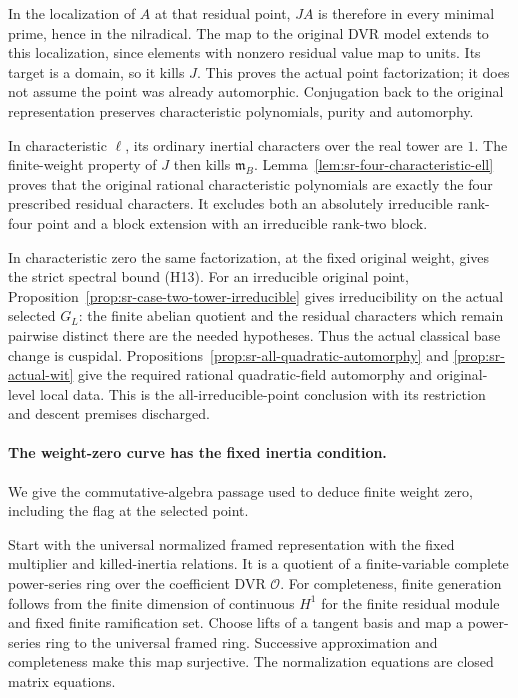 In the localization of \(A\) at that residual point,
\(JA\) is therefore in every minimal prime, hence in the
nilradical. The map to the original DVR model extends to
this localization, since elements with nonzero residual
value map to units. Its target is a domain, so it kills
\(J\). This proves the actual point factorization; it
does not assume the point was already automorphic.
Conjugation back to the original representation preserves
characteristic polynomials, purity and automorphy.

In characteristic \(\ell\), its ordinary inertial
characters over the real tower are \(1\).
The finite-weight property of \(J\) then kills
\(\mathfrak m_B\).
Lemma~\ref{lem:sr-four-characteristic-ell} proves that the
original rational characteristic polynomials are exactly
the four prescribed residual characters.
It excludes both an absolutely irreducible rank-four point
and a block extension with an irreducible rank-two block.

In characteristic zero the same factorization, at the fixed
original weight, gives the strict spectral bound (H13).
For an irreducible original point,
Proposition~\ref{prop:sr-case-two-tower-irreducible}
gives irreducibility on the actual selected \(G_L\):
the finite abelian quotient and the residual characters
which remain pairwise distinct there are the needed
hypotheses. Thus the actual classical base change is
cuspidal. Propositions~\ref{prop:sr-all-quadratic-automorphy}
and \ref{prop:sr-actual-wit} give the required rational
quadratic-field automorphy and original-level local data.
This is the all-irreducible-point conclusion with its
restriction and descent premises discharged.

\paragraph{The weight-zero curve has the fixed inertia condition.}
We give the commutative-algebra passage used to deduce finite
weight zero, including the flag at the selected point.

Start with the universal normalized framed representation
with the fixed multiplier and killed-inertia relations.
It is a quotient of a finite-variable complete power-series
ring over the coefficient DVR \(\mathcal O\).
For completeness, finite generation follows from the finite
dimension of continuous \(H^1\) for the finite residual
module and fixed finite ramification set.
Choose lifts of a tangent basis and map a power-series ring
to the universal framed ring. Successive approximation and
completeness make this map surjective.
The normalization equations are closed matrix equations.

